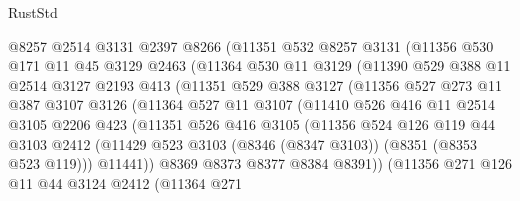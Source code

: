 \begin{lexlean}{RustStd}
\begin{coremodule}
{\begin{coremodule}
{{{{{{{{{{{{{{{{{{{{{{{{{{{{{{{{{{{{{{{{{{{{{{{{{{              @8257
              @2514
              @3131
              @2397
              @8266
              (@11351
                @532
                @8257
                @3131
                (@11356
                  @530
                  @171
                  @11
                  @45
                  @3129
                  @2463
                  (@11364
                    @530
                    @11
                    @3129
                    (@11390
                      @529
                      @388
                      @11
                      @2514
                      @3127
                      @2193
                      @413
                      (@11351
                        @529
                        @388
                        @3127
                        (@11356
                          @527
                          @273
                          @11
                          @387
                          @3107
                          @3126
                          (@11364
                            @527
                            @11
                            @3107
                            (@11410
                              @526
                              @416
                              @11
                              @2514
                              @3105
                              @2206
                              @423
                              (@11351
                                @526
                                @416
                                @3105
                                (@11356
                                  @524
                                  @126
                                  @119
                                  @44
                                  @3103
                                  @2412
                                  (@11429
                                    @523
                                    @3103
                                    (@8346 (@8347 @3103))
                                    (@8351 (@8353 @523 @119)))
                                  @11441))
                              @8369
                              @8373
                              @8377
                              @8384
                              @8391))
                          (@11356
                            @271
                            @126
                            @11
                            @44
                            @3124
                            @2412
                            (@11364
                              @271
}}}}}}}}}}}}}}}}}}}}}}}}}}}}}}}}}}}}}}}}}}}}}}}}}}
\end{coremodule}}
\end{coremodule}
\end{lexlean}
